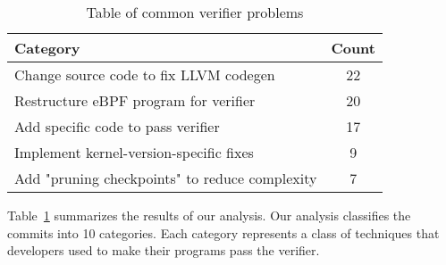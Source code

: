 \begin{table}[t]
    \small
    \centering
    \begin{tabular}{lc}%
        \toprule
        \textbf{Category} & \textbf{Count} \\
        \midrule
        Change source code to fix LLVM codegen & 22 \\          %
        Restructure eBPF program for verifier & 20 \\           %
        Add specific code to pass verifier & 17 \\              %
        Implement kernel-version-specific fixes & 9 \\          %
        Add "pruning checkpoints" to reduce complexity & 7 \\   %
        \bottomrule
    \end{tabular}
    \caption{Table of common verifier problems}
    \label{fig:commit-table}
\end{table}

Table~\ref{fig:commit-table} summarizes the results of our analysis.
Our analysis classifies the commits into 10 categories.
Each category represents a class of techniques that developers used to make their programs pass the verifier.


